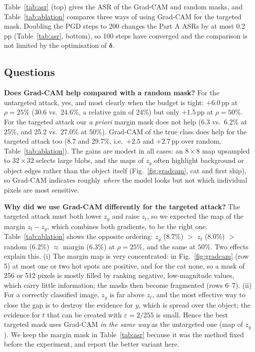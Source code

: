\documentclass[10pt,a4paper]{article}
\newcommand{\dd}{\boldsymbol{\delta}}
\begin{document}
Table~\ref{tab:asr} (top) gives the ASR of the Grad-CAM and random masks, and
Table~\ref{tab:ablation} compares three ways of using Grad-CAM for the targeted
mask. Doubling the PGD steps to 200 changes the Part A ASRs by at most 0.2\,pp
(Table~\ref{tab:asr}, bottom), so 100 steps have converged and the
comparison is not limited by the optimisation of $\dd$.

\subsection{Questions}
\label{sec:ablation}

\textbf{Does Grad-CAM help compared with a random mask?} For the untargeted attack,
yes, and most clearly when the budget is tight: $+6.0$\,pp at $\rho=25\%$
(30.6 vs.\ 24.6\%, a relative gain of 24\%) but only $+1.5$\,pp at $\rho=50\%$.
For the targeted attack our \emph{a priori} margin mask does not help (6.3 vs.\
6.2\% at 25\%, and 25.2 vs.\ 27.0\% at 50\%). Grad-CAM of the true class does help
for the targeted attack too (8.7 and 29.7\%, i.e.\ $+2.5$ and $+2.7$\,pp over random,
Table~\ref{tab:ablation}). The gains are modest in all cases: an $8\times8$ map
upsampled to $32\times32$ selects large blobs, and the maps of $z_y$ often highlight
background or object edges rather than the object itself (Fig.~\ref{fig:gradcam},
cat and first ship), so Grad-CAM indicates roughly \emph{where} the model looks
but not which individual pixels are most sensitive.

\textbf{Why did we use Grad-CAM differently for the targeted attack?} The targeted
attack must both lower $z_y$ and raise $z_t$, so we expected the map of the margin
$z_t-z_y$, which combines both gradients, to be the right one. Table~\ref{tab:ablation}
shows the opposite ordering: $z_y$ (8.7\%) $>$ $z_t$ (8.0\%) $>$ random (6.2\%)
$\approx$ margin (6.3\%) at $\rho=25\%$, and the same at $50\%$. Two effects explain
this. (i) The margin map is very concentrated: in Fig.~\ref{fig:gradcam} (row 5) at most one
or two hot spots are positive, and for the cat none, so a mask of 256 or 512
pixels is mostly filled by ranking negative, low-magnitude values, which carry
little information; the masks then become fragmented (rows 6--7). (ii) For a
correctly classified image, $z_y$ is far above $z_t$, and the most effective way to
close the gap is to destroy the evidence for $y$, which is spread over the object;
the evidence for $t$ that can be created with $\varepsilon=2/255$ is small. Hence
the best targeted mask uses Grad-CAM \emph{in the same way} as the untargeted one
(map of $z_y$). We keep the margin mask in Table~\ref{tab:asr} because it was the
method fixed before the experiment, and report the better variant here.
\end{document}
